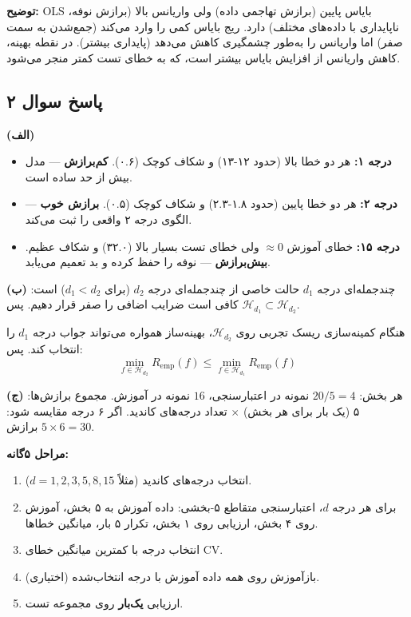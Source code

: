 \documentclass[12pt,a4paper]{article}
\begin{document}
\textbf{توضیح:} OLS بایاس پایین (برازش تهاجمی داده) ولی واریانس بالا (برازش نوفه، ناپایداری با داده‌های مختلف) دارد. ریج بایاس کمی را وارد می‌کند (جمع‌شدن به سمت صفر) اما واریانس را به‌طور چشمگیری کاهش می‌دهد (پایداری بیشتر). در نقطه بهینه، کاهش واریانس از افزایش بایاس بیشتر است، که به خطای تست کمتر منجر می‌شود.

\newpage

\subsection*{پاسخ سوال ۲}

\textbf{(الف)}
\begin{itemize}
\item \textbf{درجه ۱:} هر دو خطا بالا (حدود ۱۲-۱۳) و شکاف کوچک (۰.۶). \textbf{کم‌برازش} — مدل بیش از حد ساده است.
\item \textbf{درجه ۲:} هر دو خطا پایین (حدود ۱.۸-۲.۳) و شکاف کوچک (۰.۵). \textbf{برازش خوب} — الگوی درجه ۲ واقعی را ثبت می‌کند.
\item \textbf{درجه ۱۵:} خطای آموزش $\approx 0$ ولی خطای تست بسیار بالا (۳۲.۰) و شکاف عظیم. \textbf{بیش‌برازش} — نوفه را حفظ کرده و بد تعمیم می‌یابد.
\end{itemize}

\bigskip

\textbf{(ب)} چندجمله‌ای درجه $d_1$ حالت خاصی از چندجمله‌ای درجه $d_2$ (برای $d_1 < d_2$) است: کافی است ضرایب اضافی را صفر قرار دهیم. پس $\mathcal{H}_{d_1} \subset \mathcal{H}_{d_2}$.

هنگام کمینه‌سازی ریسک تجربی روی $\mathcal{H}_{d_2}$، بهینه‌ساز همواره می‌تواند جواب درجه $d_1$ را انتخاب کند. پس:
$$\min_{f \in \mathcal{H}_{d_2}} R_{\text{emp}}(f) \leq \min_{f \in \mathcal{H}_{d_1}} R_{\text{emp}}(f)$$

\bigskip

\textbf{(ج)} هر بخش: $20/5 = 4$ نمونه در اعتبارسنجی، $16$ نمونه در آموزش. مجموع برازش‌ها: ۵ (یک بار برای هر بخش) $\times$ تعداد درجه‌های کاندید. اگر ۶ درجه مقایسه شود: $5 \times 6 = 30$ برازش.

\textbf{مراحل ۵گانه:}
\begin{enumerate}
\item انتخاب درجه‌های کاندید (مثلاً $d = 1, 2, 3, 5, 8, 15$).
\item برای هر درجه $d$، اعتبارسنجی متقاطع ۵-بخشی: داده آموزش به ۵ بخش، آموزش روی ۴ بخش، ارزیابی روی ۱ بخش، تکرار ۵ بار، میانگین خطاها.
\item انتخاب درجه با کمترین میانگین خطای CV.
\item (اختیاری) بازآموزش روی همه داده آموزش با درجه انتخاب‌شده.
\item ارزیابی \textbf{یک‌بار} روی مجموعه تست.
\end{enumerate}
\end{document}
